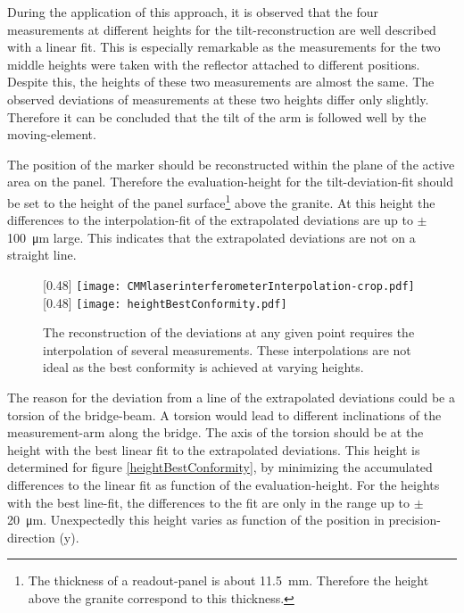 \documentclass[
twoside,            %
BCOR1.4cm,          %
10pt,               %
headings=normal,    %
headsepline,        %
clearplainpage,		%
final,              %
div=14,
open=right,
bibliography=toc
]{scrreprt}
\begin{document}
During the application of this approach, it is observed that the four measurements at different heights for the tilt-reconstruction are well described with a linear fit.
This is especially remarkable as the measurements for the two middle heights were taken with the reflector attached to different positions.
Despite this, the heights of these two measurements are almost the same.
The observed deviations of measurements at these two heights differ only slightly.
Therefore it can be concluded that the tilt of the arm is followed well by the moving-element.

The position of the marker should be reconstructed within the plane of the active area on the panel.
Therefore the evaluation-height for the tilt-deviation-fit should be set to the height of the panel surface\footnote{
	The thickness of a readout-panel is about \SI{11.5}{mm}.
	Therefore the height above the granite correspond to this thickness.
} above the granite.
At this height the differences to the interpolation-fit of the extrapolated deviations are up to $\pm$\SI{100}{\micro\m} large.
This indicates that the extrapolated deviations are not on a straight line.

\begin{figure}[!h]
	\centering
	[0.48\textwidth]
	{\texttt{[image: CMMlaserinterferometerInterpolation-crop.pdf]}}
	\hfill
	[0.48\textwidth]
	{\texttt{[image: heightBestConformity.pdf]}}
	\vspace{-2mm}
	\caption{
		The reconstruction of the deviations at any given point requires the interpolation of several measurements.
		These interpolations are not ideal as the best conformity is achieved at varying heights. 
	}
\end{figure}

The reason for the deviation from a line of the extrapolated deviations could be a torsion of the bridge-beam.
A torsion would lead to different inclinations of the measurement-arm along the bridge.
The axis of the torsion should be at the height with the best linear fit to the extrapolated deviations.
This height is determined for figure \ref{heightBestConformity}, by minimizing the accumulated differences to the linear fit as function of the evaluation-height.
For the heights with the best line-fit, the differences to the fit are only in the range up to $\pm$\SI{20}{\micro\m}.
Unexpectedly this height varies as function of the position in precision-direction (y).
\end{document}
